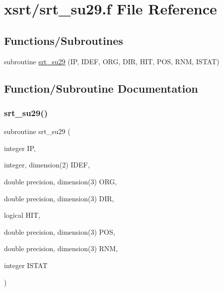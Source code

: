 \hypertarget{srt__su29_8f}{}\section{xsrt/srt\+\_\+su29.f File Reference}
\label{srt__su29_8f}
\subsection*{Functions/\+Subroutines}
\begin{DoxyCompactItemize}
\item 
subroutine \hyperlink{srt__su29_8f_a81c43882b8dddff50c7812b55d588a0c}{srt\+\_\+su29} (IP, I\+D\+EF, O\+RG, D\+IR, H\+IT, P\+OS, R\+NM, I\+S\+T\+AT)
\end{DoxyCompactItemize}


\subsection{Function/\+Subroutine Documentation}
\mbox{\label{srt__su29_8f_a81c43882b8dddff50c7812b55d588a0c}} 
\subsubsection{\texorpdfstring{srt\+\_\+su29()}{srt\_su29()}}
{\footnotesize\ttfamily subroutine srt\+\_\+su29 (\begin{DoxyParamCaption}\item[{integer}]{IP,  }\item[{integer, dimension(2)}]{I\+D\+EF,  }\item[{double precision, dimension(3)}]{O\+RG,  }\item[{double precision, dimension(3)}]{D\+IR,  }\item[{logical}]{H\+IT,  }\item[{double precision, dimension(3)}]{P\+OS,  }\item[{double precision, dimension(3)}]{R\+NM,  }\item[{integer}]{I\+S\+T\+AT }\end{DoxyParamCaption})}

